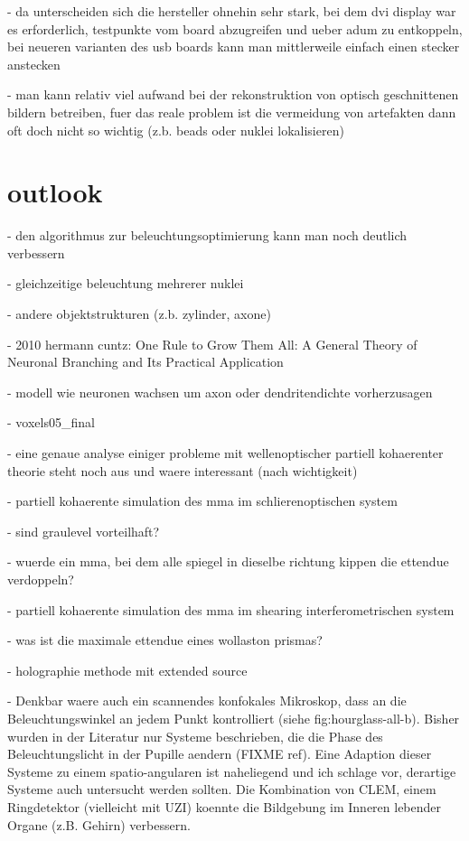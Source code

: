 \documentclass[oneside,a4paper,12pt,BCOR20mm,DIV14]{scrbook} %
\begin{document}
  - da unterscheiden sich die hersteller ohnehin sehr stark, bei dem
    dvi display war es erforderlich, testpunkte vom board abzugreifen
    und ueber adum zu entkoppeln, bei neueren varianten des usb boards
    kann man mittlerweile einfach einen stecker anstecken

- man kann relativ viel aufwand bei der rekonstruktion von optisch
  geschnittenen bildern betreiben, fuer das reale problem ist die
  vermeidung von artefakten dann oft doch nicht so wichtig (z.b. beads
  oder nuklei lokalisieren)


  
\chapter{outlook}
\label{sec:outlook}
- den algorithmus zur beleuchtungsoptimierung kann man noch deutlich
  verbessern

  - gleichzeitige beleuchtung mehrerer nuklei

  - andere objektstrukturen (z.b. zylinder, axone)

    - 2010 hermann cuntz: One Rule to Grow Them All: A General Theory
      of Neuronal Branching and Its Practical Application

      - modell wie neuronen wachsen um axon oder dendritendichte
        vorherzusagen

  - voxels05\_final

- eine genaue analyse einiger probleme mit wellenoptischer partiell
  kohaerenter theorie steht noch aus und waere interessant (nach
  wichtigkeit)

  - partiell kohaerente simulation des mma im schlierenoptischen system

    - sind graulevel vorteilhaft?

    - wuerde ein mma, bei dem alle spiegel in dieselbe richtung kippen
      die ettendue verdoppeln?

  - partiell kohaerente simulation des mma im shearing
    interferometrischen system

    - was ist die maximale ettendue eines wollaston prismas?

  - holographie methode mit extended source

  - Denkbar waere auch ein scannendes konfokales Mikroskop, dass an
    die Beleuchtungswinkel an jedem Punkt kontrolliert (siehe
    fig:hourglass-all-b).  Bisher wurden in der Literatur nur Systeme
    beschrieben, die die Phase des Beleuchtungslicht in der Pupille
    aendern (FIXME ref). Eine Adaption dieser Systeme zu einem
    spatio-angularen ist naheliegend und ich schlage vor, derartige
    Systeme auch untersucht werden sollten. Die Kombination von CLEM,
    einem Ringdetektor (vielleicht mit UZI) koennte die Bildgebung im
    Inneren lebender Organe (z.B. Gehirn) verbessern.

\appendix



%
\end{document}
